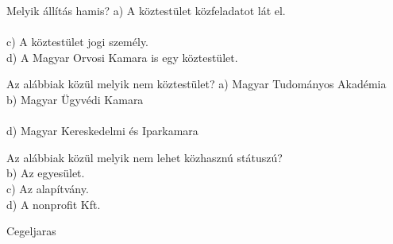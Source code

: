 \begin{frame}

\begin{tcolorbox}[title={91. Kérdés}]
Melyik állítás hamis?
\tcblower
a) A köztestület közfeladatot lát el.\\
\\
c) A köztestület jogi személy.\\
d) A Magyar Orvosi Kamara is egy köztestület.
\end{tcolorbox}

\begin{tcolorbox}[title={92. Kérdés}]
Az alábbiak közül melyik nem köztestület?
\tcblower
a) Magyar Tudományos Akadémia\\
b) Magyar Ügyvédi Kamara\\
\\
d) Magyar Kereskedelmi és Iparkamara
\end{tcolorbox}

\begin{tcolorbox}[title={93. Kérdés}]
Az alábbiak közül melyik nem lehet közhasznú státuszú?
\tcblower
{}\\
b) Az egyesület.\\
c) Az alapítvány.\\
d) A nonprofit Kft.
\end{tcolorbox}

\end{frame}

\begin{frame}[plain]
\begin{tcolorbox}[center, colback={myyellow}, coltext={black}, colframe={myyellow}]
    { Cegeljaras}\\
\end{tcolorbox}
\end{frame}


